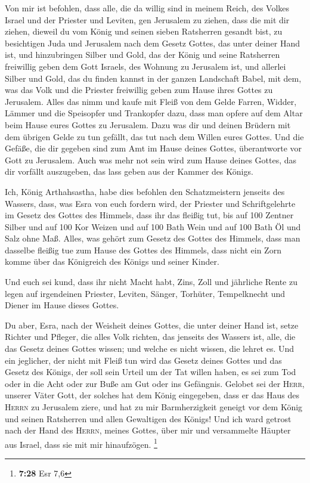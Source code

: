  Von mir ist befohlen, dass alle, die da willig sind in
meinem Reich, des Volkes Israel und der Priester und Leviten, gen
Jerusalem zu ziehen, dass die mit dir ziehen,  dieweil du
vom König und seinen sieben Ratsherren gesandt bist, zu besichtigen Juda
und Jerusalem nach dem Gesetz Gottes, das unter deiner Hand ist,
 und hinzubringen Silber und Gold, das der König und
seine Ratsherren freiwillig geben dem Gott Israels, des Wohnung zu
Jerusalem ist,  und allerlei Silber und Gold, das du
finden kannst in der ganzen Landschaft Babel, mit dem, was das Volk und
die Priester freiwillig geben zum Hause ihres Gottes zu Jerusalem.
 Alles das nimm und kaufe mit Fleiß von dem Gelde Farren,
Widder, Lämmer und die Speisopfer und Trankopfer dazu, dass man opfere
auf dem Altar beim Hause eures Gottes zu Jerusalem.  Dazu
was dir und deinen Brüdern mit dem übrigen Gelde zu tun gefällt, das tut
nach dem Willen eures Gottes.  Und die Gefäße, die dir
gegeben sind zum Amt im Hause deines Gottes, überantworte vor Gott zu
Jerusalem.  Auch was mehr not sein wird zum Hause deines
Gottes, das dir vorfällt auszugeben, das lass geben aus der Kammer des
Königs.

 Ich, König Arthahsastha, habe dies befohlen den
Schatzmeistern jenseits des Wassers, dass, was Esra von euch fordern
wird, der Priester und Schriftgelehrte im Gesetz des Gottes des Himmels,
dass ihr das fleißig tut,  bis auf 100 Zentner Silber und
auf 100 Kor Weizen und auf 100 Bath Wein und auf 100 Bath Öl und Salz
ohne Maß.  Alles, was gehört zum Gesetz des Gottes des
Himmels, dass man dasselbe fleißig tue zum Hause des Gottes des Himmels,
dass nicht ein Zorn komme über das Königreich des Königs und seiner
Kinder.

 Und euch sei kund, dass ihr nicht Macht habt, Zins, Zoll
und jährliche Rente zu legen auf irgendeinen Priester, Leviten, Sänger,
Torhüter, Tempelknecht und Diener im Hause dieses Gottes.

 Du aber, Esra, nach der Weisheit deines Gottes, die
unter deiner Hand ist, setze Richter und Pfleger, die alles Volk
richten, das jenseits des Wassers ist, alle, die das Gesetz deines
Gottes wissen; und welche es nicht wissen, die lehret es.
 Und ein jeglicher, der nicht mit Fleiß tun wird das
Gesetz deines Gottes und das Gesetz des Königs, der soll sein Urteil um
der Tat willen haben, es sei zum Tod oder in die Acht oder zur Buße am
Gut oder ins Gefängnis.  Gelobet sei der \textsc{Herr},
unserer Väter Gott, der solches hat dem König eingegeben, dass er das
Haus des \textsc{Herrn} zu Jerusalem ziere,  und hat zu
mir Barmherzigkeit geneigt vor dem König und seinen Ratsherren und allen
Gewaltigen des Königs! Und ich ward getrost nach der Hand des
\textsc{Herrn}, meines Gottes, über mir und versammelte Häupter aus
Israel, dass sie mit mir hinaufzögen. \footnote{\textbf{7:28} Esr 7,6}


